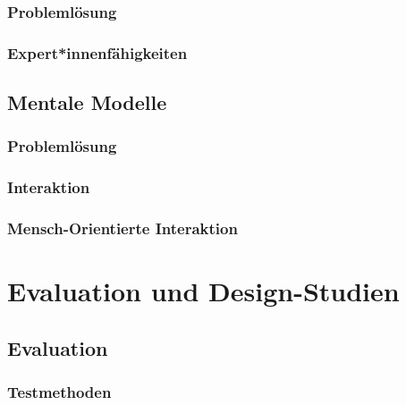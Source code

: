             \subsubsection{Problemlösung} %

            \subsubsection{Expert*innenfähigkeiten} %

        \subsection{Mentale Modelle} %

            \subsubsection{Problemlösung} %

            \subsubsection{Interaktion} %

            \subsubsection{Mensch-Orientierte Interaktion} %

    \section{Evaluation und Design-Studien} %

        \subsection{Evaluation} %

            \subsubsection{Testmethoden} %

